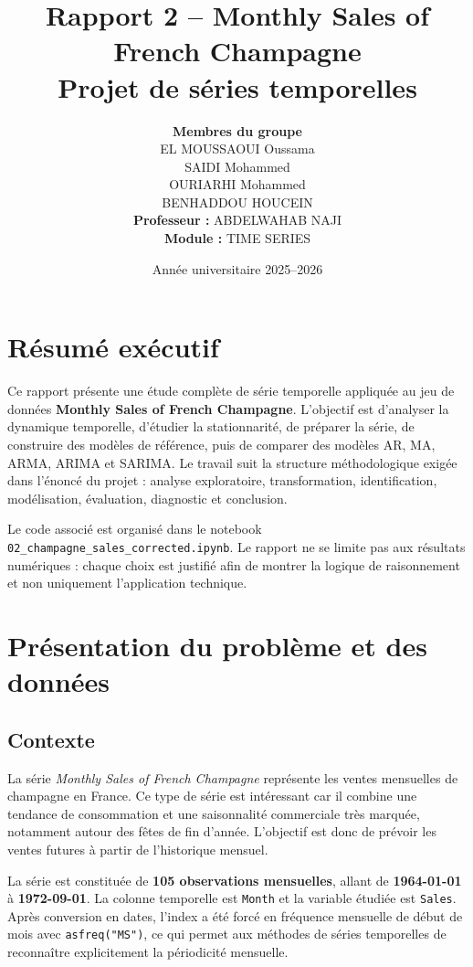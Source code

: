 \documentclass[12pt,a4paper]{report}
\title{\textbf{Rapport 2 -- Monthly Sales of French Champagne}\\[0.4cm]\large Projet de séries temporelles}
\author{\textbf{Membres du groupe}\\ EL MOUSSAOUI Oussama\\
SAIDI Mohammed\\
OURIARHI Mohammed\\
BENHADDOU HOUCEIN \\[0.5cm]\textbf{Professeur :} ABDELWAHAB NAJI\\\textbf{Module :} TIME SERIES}
\date{Année universitaire 2025--2026}
\begin{document}
\maketitle
\clearpage
\renewcommand{\contentsname}{Table des matières}
\tableofcontents
\clearpage

\chapter*{Résumé exécutif}
Ce rapport présente une étude complète de série temporelle appliquée au jeu de données \textbf{Monthly Sales of French Champagne}. L'objectif est d'analyser la dynamique temporelle, d'étudier la stationnarité, de préparer la série, de construire des modèles de référence, puis de comparer des modèles AR, MA, ARMA, ARIMA et SARIMA. Le travail suit la structure méthodologique exigée dans l'énoncé du projet : analyse exploratoire, transformation, identification, modélisation, évaluation, diagnostic et conclusion.

Le code associé est organisé dans le notebook \texttt{02\_champagne\_sales\_corrected.ipynb}. Le rapport ne se limite pas aux résultats numériques : chaque choix est justifié afin de montrer la logique de raisonnement et non uniquement l'application technique.

\chapter{Présentation du problème et des données}
\section{Contexte}
La série \textit{Monthly Sales of French Champagne} représente les ventes mensuelles de champagne en France. Ce type de série est intéressant car il combine une tendance de consommation et une saisonnalité commerciale très marquée, notamment autour des fêtes de fin d'année. L'objectif est donc de prévoir les ventes futures à partir de l'historique mensuel.

La série est constituée de \textbf{105 observations mensuelles}, allant de \textbf{1964-01-01} à \textbf{1972-09-01}. La colonne temporelle est \texttt{Month} et la variable étudiée est \texttt{Sales}. Après conversion en dates, l'index a été forcé en fréquence mensuelle de début de mois avec \texttt{asfreq("MS")}, ce qui permet aux méthodes de séries temporelles de reconnaître explicitement la périodicité mensuelle.
\end{document}
